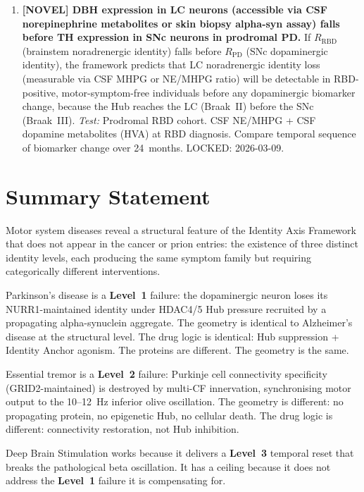 \documentclass[12pt,a4paper]{article}
\newcommand{\Lev}[1]{\textbf{Level~#1}}
\begin{document}
\begin{enumerate}[leftmargin=2em, itemsep=0.6em, label=\textbf{P\arabic*.}]
  \item \textbf{[NOVEL] DBH expression in LC neurons (accessible via
  CSF norepinephrine metabolites or skin biopsy alpha-syn assay) falls
  before TH expression in SNc neurons in prodromal PD.} If $R_{\mathrm{RBD}}$
  (brainstem noradrenergic identity) falls before $R_{\mathrm{PD}}$
  (SNc dopaminergic identity), the framework predicts that LC noradrenergic
  identity loss (measurable via CSF MHPG or NE/MHPG ratio) will be
  detectable in RBD-positive, motor-symptom-free individuals before
  any dopaminergic biomarker change, because the Hub reaches the LC
  (Braak~II) before the SNc (Braak~III).
  \textit{Test:} Prodromal RBD cohort. CSF NE/MHPG + CSF dopamine
  metabolites (HVA) at RBD diagnosis. Compare temporal sequence of
  biomarker change over 24~months.
  LOCKED: 2026-03-09.

\end{enumerate}

\section*{Summary Statement}

Motor system diseases reveal a structural feature of the Identity Axis
Framework that does not appear in the cancer or prion entries: the existence
of three distinct identity levels, each producing the same symptom family
but requiring categorically different interventions.

Parkinson's disease is a \Lev{1} failure: the dopaminergic neuron loses its
NURR1-maintained identity under HDAC4/5 Hub pressure recruited by a
propagating alpha-synuclein aggregate. The geometry is identical to
Alzheimer's disease at the structural level. The drug logic is identical:
Hub suppression + Identity Anchor agonism. The proteins are different.
The geometry is the same.

Essential tremor is a \Lev{2} failure: Purkinje cell connectivity specificity
(GRID2-maintained) is destroyed by multi-CF innervation, synchronising motor
output to the 10--12~Hz inferior olive oscillation. The geometry is different:
no propagating protein, no epigenetic Hub, no cellular death. The drug logic
is different: connectivity restoration, not Hub inhibition.

Deep Brain Stimulation works because it delivers a \Lev{3} temporal reset
that breaks the pathological beta oscillation. It has a ceiling because it
does not address the \Lev{1} failure it is compensating for.
\end{document}
